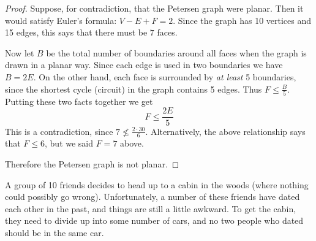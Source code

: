 \documentclass[10pt]{exam}
\begin{document}
\begin{questions}
\begin{solution}
  \begin{proof}
    Suppose, for contradiction, that the Petersen graph were planar.  Then it would satisfy Euler's formula: $V - E + F = 2$.  Since the graph has 10 vertices and 15 edges, this says that there must be $7$ faces.  
    
    Now let $B$ be the total number of boundaries around all faces when the graph is drawn in a planar way.  Since each edge is used in two boundaries we have $B = 2E$.  On the other hand, each face is surrounded by {\em at least} 5 boundaries, since the shortest cycle (circuit) in the graph contains 5 edges.  Thus $F \le \frac{B}{5}$.  Putting these two facts together we get
    \[F \le \frac{2E}{5}\]
    This is a contradiction, since $7 \not\le \frac{2\cdot 30}{6}$.  Alternatively, the above relationship says that $F \le 6$, but we said $F = 7$ above.
    
    Therefore the Petersen graph is not planar.
  \end{proof}

\end{solution}


\question A group of 10 friends decides to head up to a cabin in the woods (where nothing could possibly go wrong).  Unfortunately, a number of these friends have dated each other in the past, and things are still a little awkward.  To get the cabin, they need to divide up into some number of cars, and no two people who dated should be in the same car.
\end{questions}
\end{document}
